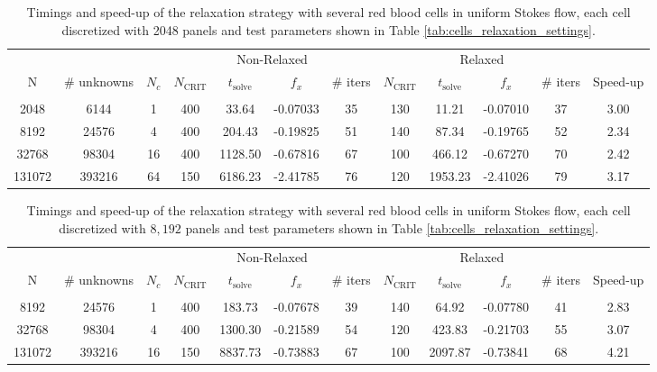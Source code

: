 \documentclass[final,3p,times]{elsarticle}
\newcommand{\ncrit}{N_{\text{CRIT}}}
\newcommand{\tsolve}{t_{\text{solve}}}
\begin{document}
\begin{table}[htp]
\footnotesize
\begin{center}
\begin{tabular}{c|c|c|cccc|cccc|c}
  & & & \multicolumn{4}{c|}{Non-Relaxed} & \multicolumn{4}{c|}{Relaxed} &  \\
  N & \# unknowns & $N_c$ & $\ncrit$ & $\tsolve$ & $f_x$ & \# iters & $\ncrit$ & $\tsolve$ & $f_x$ & \# iters & Speed-up\\
 \hline
   & & & & & & & & & &\\
  2048 & 6144 & 1 & 400 & 33.64 & -0.07033 & 35 & 130 & 11.21 & -0.07010 & 37 & 3.00\\
  8192 & 24576 & 4 & 400 & 204.43 & -0.19825 & 51 & 140 & 87.34 & -0.19765 & 52 & 2.34\\
  32768 & 98304 & 16 & 400 & 1128.50 & -0.67816 & 67 & 100 & 466.12 & -0.67270 & 70 & 2.42\\
  131072 & 393216 & 64 & 150 & 6186.23 & -2.41785 & 76 & 120 & 1953.23 & -2.41026 & 79 & 3.17\\
\end{tabular}
\end{center}
\caption{Timings and speed-up of the relaxation strategy with several red blood cells in uniform Stokes flow, each cell discretized with 2048 panels and test parameters shown in Table \ref{tab:cells_relaxation_settings}.}
\label{tab:multiple_cell_relaxation_results_2048}
\end{table}


\begin{table}[htp]
\footnotesize
\begin{center}
\begin{tabular}{c|c|c|cccc|cccc|c}
  & & & \multicolumn{4}{c|}{Non-Relaxed} & \multicolumn{4}{c|}{Relaxed} &  \\
  N & \# unknowns & $N_c$ & $\ncrit$ & $\tsolve$ & $f_x$ & \# iters & $\ncrit$ & $\tsolve$ & $f_x$ & \# iters & Speed-up\\
 \hline
   & & & & & & & & & &\\
  8192 & 24576 & 1 & 400 & 183.73 & -0.07678 & 39 & 140 & 64.92 & -0.07780 & 41 & 2.83\\
  32768 & 98304 & 4 & 400 & 1300.30 & -0.21589 & 54 & 120 & 423.83 & -0.21703 & 55 & 3.07\\
  131072 & 393216 & 16 & 150 & 8837.73 & -0.73883 & 67 & 100 & 2097.87 & -0.73841 & 68 & 4.21\\
\end{tabular}
\end{center}
\caption{Timings and speed-up of the relaxation strategy with several red blood cells in uniform Stokes flow, each cell discretized with $8,192$ panels and test parameters shown in Table \ref{tab:cells_relaxation_settings}.}
\label{tab:multiple_cell_relaxation_results_8192}
\end{table}
\end{document}
